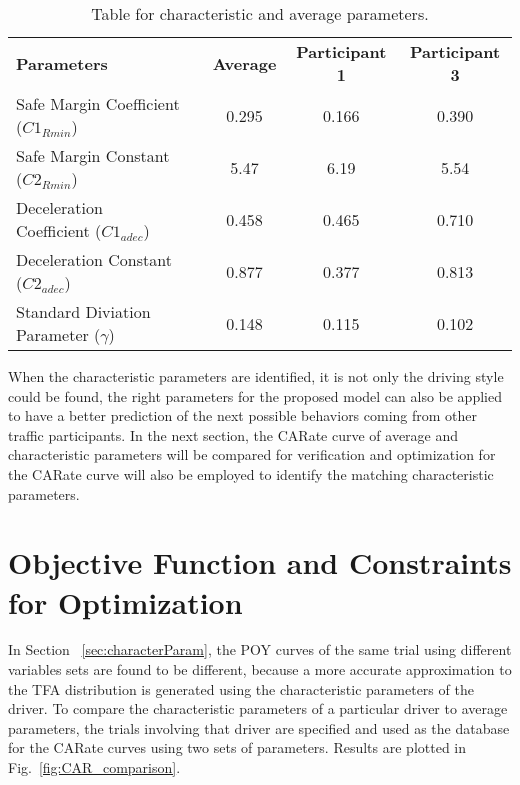 \begin{table}[htbp]
\caption{Table for characteristic and average parameters.}
\begin{center}
\label{table:character_average}
\begin{tabular}{l l c c c}
& & \\ %
\hline
\textbf{Parameters} &  &\textbf{Average} &\textbf{Participant 1} &\textbf{Participant 3} \\
\hline
Safe Margin Coefficient (${C1}_{Rmin}$)     & & 0.295 & 0.166 & 0.390 \\
Safe Margin Constant (${C2}_{Rmin}$)        & & 5.47 & 6.19 & 5.54  \\
Deceleration Coefficient (${C1}_{adec}$)    & & 0.458 & 0.465 & 0.710 \\
Deceleration Constant (${C2}_{adec}$)       & & 0.877 & 0.377 & 0.813 \\
Standard Diviation Parameter ($\gamma$)     & & 0.148 & 0.115 & 0.102 \\
\hline
\end{tabular}
\end{center}
\end{table}


When the characteristic parameters are identified, it is not only the driving style could be found, the right parameters for the proposed model can also be applied to have a better prediction of the next possible behaviors coming from other traffic participants. In the next section, the CARate curve of average and characteristic parameters will be compared for verification and optimization for the CARate curve will also be employed to identify the matching characteristic parameters. 

\section{Objective Function and Constraints for Optimization}
\label{sec:optim_obj_con}

In Section ~\ref{sec:characterParam}, the POY curves of the same trial using different variables sets are found to be different, because a more accurate approximation to the TFA distribution is generated using the characteristic parameters of the driver. To compare the characteristic parameters of a particular driver to average parameters, the trials involving that driver are specified and used as the database for the CARate curves using two sets of parameters. Results are plotted in Fig.~\ref{fig:CAR_comparison}.


